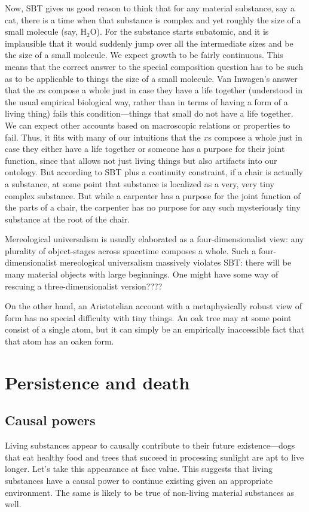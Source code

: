Now, SBT gives us good reason to think that for any material substance, say a cat, there is a time when 
that substance is complex and yet roughly the size of a small molecule (say, H$_2$O). For the substance starts subatomic, 
and it is implausible that it would suddenly jump over all the intermediate sizes and be the size of a small molecule.
We expect growth to be fairly continuous. This means that the correct answer to the special composition question
has to be such as to be applicable to things the size of a small molecule. Van Inwagen's answer that the $x$s compose
a whole just in case they have a life together (understood in the usual empirical biological way, rather than in terms of having 
a form of a living thing) fails this condition---things that small do not have a life together. We can expect other 
accounts based on macroscopic relations or properties to fail. Thus, it fits with many of our intuitions that the $x$s 
compose a whole just in case they either have a life together or someone has a purpose for their joint function, since
that allows not just living things but also artifacts into our ontology. But according to SBT plus a continuity constraint,
if a chair is actually a substance, at some point that substance is localized as a very, very tiny complex substance.
But while a carpenter has a purpose for the joint function of the parts of a chair, the carpenter has no purpose for any 
such mysteriously tiny substance at the root of the chair. 

Mereological universalism is usually elaborated as a four-dimensionalist view: any plurality of object-stages across 
spacetime composes a whole. Such a four-dimensionalist mereological universalism massively violates SBT: there will be 
many material objects with large beginnings. One might have some way of rescuing a three-dimensionalist version????

On the other hand, an Aristotelian account with a metaphysically robust view of form has no special difficulty with 
tiny things. An oak tree may at some point consist of a single atom, but it can simply be an empirically inaccessible 
fact that that atom has an oaken form.


\section{Persistence and death}
\subsection{Causal powers}
Living substances appear to causally contribute to their future existence---dogs that eat healthy food and trees that succeed
in processing sunlight are apt to live longer. Let's take this appearance at face value. This suggests that living substances
have a causal power to continue existing given an appropriate environment. The same is likely to be true of non-living material
substances as well. 

